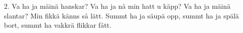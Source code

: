 2.  Va ha ja mäinä hanskar?
    Va ha ja nå min hatt u käpp?
    Va ha ja mäinä slantar?
    Min fikkä känns så lätt.
    Summt ha ja säupä opp,
    summt ha ja spälä bort,
    summt ha vakkrä flikkar fått.
